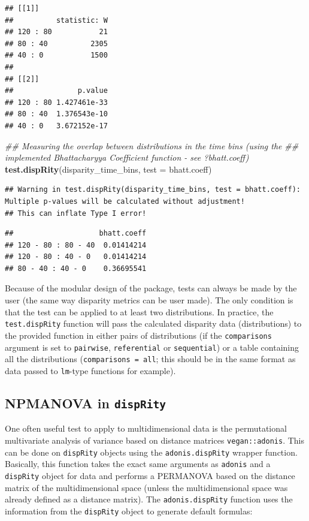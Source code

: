 \documentclass[]{book}
\newenvironment{Shaded}{\begin{snugshade}}{\end{snugshade}}
\newcommand{\CommentTok}[1]{\textcolor[rgb]{0.56,0.35,0.01}{\textit{#1}}}
\newcommand{\DataTypeTok}[1]{\textcolor[rgb]{0.13,0.29,0.53}{#1}}
\newcommand{\KeywordTok}[1]{\textcolor[rgb]{0.13,0.29,0.53}{\textbf{#1}}}
\newcommand{\NormalTok}[1]{#1}
\begin{document}
\begin{verbatim}
## [[1]]
##          statistic: W
## 120 : 80           21
## 80 : 40          2305
## 40 : 0           1500
## 
## [[2]]
##               p.value
## 120 : 80 1.427461e-33
## 80 : 40  1.376543e-10
## 40 : 0   3.672152e-17
\end{verbatim}

\begin{Shaded}
\begin{Highlighting}[]
\CommentTok{## Measuring the overlap between distributions in the time bins (using the}
\CommentTok{## implemented Bhattacharyya Coefficient function - see ?bhatt.coeff)}
\KeywordTok{test.dispRity}\NormalTok{(disparity_time_bins, }\DataTypeTok{test =}\NormalTok{ bhatt.coeff)}
\end{Highlighting}
\end{Shaded}

\begin{verbatim}
## Warning in test.dispRity(disparity_time_bins, test = bhatt.coeff): Multiple p-values will be calculated without adjustment!
## This can inflate Type I error!
\end{verbatim}

\begin{verbatim}
##                    bhatt.coeff
## 120 - 80 : 80 - 40  0.01414214
## 120 - 80 : 40 - 0   0.01414214
## 80 - 40 : 40 - 0    0.36695541
\end{verbatim}

Because of the modular design of the package, tests can always be made by the user (the same way disparity metrics can be user made).
The only condition is that the test can be applied to at least two distributions.
In practice, the \texttt{test.dispRity} function will pass the calculated disparity data (distributions) to the provided function in either pairs of distributions (if the \texttt{comparisons} argument is set to \texttt{pairwise}, \texttt{referential} or \texttt{sequential}) or a table containing all the distributions (\texttt{comparisons\ =\ all}; this should be in the same format as data passed to \texttt{lm}-type functions for example).

\hypertarget{adonis}{%
\subsection{\texorpdfstring{NPMANOVA in \texttt{dispRity}}{NPMANOVA in dispRity}}\label{adonis}}

One often useful test to apply to multidimensional data is the permutational multivariate analysis of variance based on distance matrices \texttt{vegan::adonis}.
This can be done on \texttt{dispRity} objects using the \texttt{adonis.dispRity} wrapper function.
Basically, this function takes the exact same arguments as \texttt{adonis} and a \texttt{dispRity} object for data and performs a PERMANOVA based on the distance matrix of the multidimensional space (unless the multidimensional space was already defined as a distance matrix).
The \texttt{adonis.dispRity} function uses the information from the \texttt{dispRity} object to generate default formulas:
\end{document}
